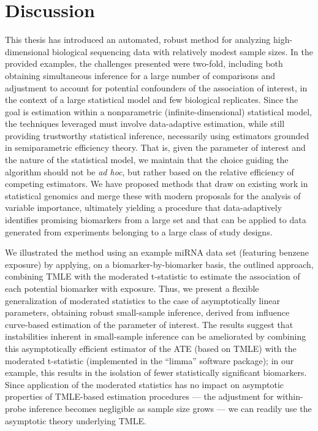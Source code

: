 \chapter{Discussion}

This thesis has introduced an automated, robust method for analyzing
high-dimensional biological sequencing data with relatively modest sample sizes.
In the provided examples, the challenges presented were two-fold, including both
obtaining simultaneous inference for a large number of comparisons and
adjustment to account for potential confounders of the association of interest,
in the context of a large statistical model and few biological replicates. Since
the goal is estimation within a nonparametric (infinite-dimensional) statistical
model, the techniques leveraged must involve data-adaptive estimation, while
still providing trustworthy statistical inference, necessarily using estimators
grounded in semiparametric efficiency theory. That is, given the parameter of
interest and the nature of the statistical model, we maintain that the choice
guiding the algorithm should not be \textit{ad hoc}, but rather based on the
relative efficiency of competing estimators. We have proposed methods that draw
on existing work in statistical genomics and merge these with modern proposals
for the analysis of variable importance, ultimately yielding a procedure that
data-adaptively identifies promising biomarkers from a large set and that can be
applied to data generated from experiments belonging to a large class of study
designs.

We illustrated the method using an example miRNA data set (featuring benzene
exposure) by applying, on a biomarker-by-biomarker basis, the outlined approach,
combining TMLE with the moderated t-statistic to estimate the association of
each potential biomarker with exposure. Thus, we present a flexible
generalization of moderated statistics to the case of asymptotically linear
parameters, obtaining robust small-sample inference, derived from influence
curve-based estimation of the parameter of interest. The results suggest that
instabilities inherent in small-sample inference can be ameliorated by combining
this asymptotically efficient estimator of the ATE (based on TMLE) with the
moderated t-statistic (implemented in the ``limma'' software package); in our
example, this results in the isolation of fewer statistically significant
biomarkers. Since application of the moderated statistics has no impact on
asymptotic properties of TMLE-based estimation procedures --- the adjustment for
within-probe inference becomes negligible as sample size grows --- we can
readily use the asymptotic theory underlying TMLE.

